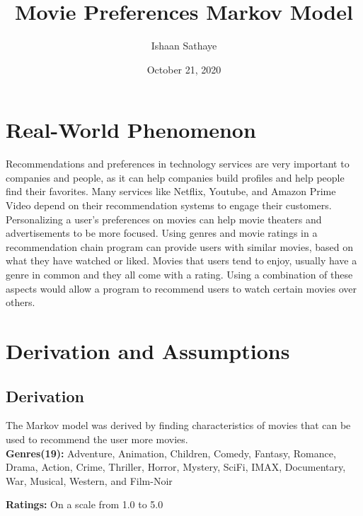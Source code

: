 \documentclass{article}
\title{Movie Preferences Markov Model}
\author{Ishaan Sathaye }
\date{October 21, 2020}
\begin{document}
\maketitle

\section{Real-World Phenomenon}
Recommendations and preferences in technology services are very important to 
companies and people, as it can help companies build profiles and help people find their favorites.
Many services like Netflix, Youtube, and Amazon Prime Video depend on their recommendation systems to engage their customers.
Personalizing a user's preferences on movies can help movie theaters and advertisements to be more focused. Using genres and movie ratings
in a recommendation chain program can provide users with similar movies, based on what they have watched or liked. Movies that users 
tend to enjoy, usually have a genre in common and they all come with a rating. Using a combination of these aspects would allow a program to 
recommend users to watch certain movies over others. 

\section{Derivation and Assumptions}
\subsection{Derivation}
The Markov model was derived by finding characteristics of movies that can be used to recommend the user more movies.\\

\textbf{Genres(19):} Adventure, Animation, Children, Comedy, Fantasy, Romance, Drama, Action, Crime, Thriller, Horror, Mystery, SciFi, IMAX, Documentary,
War, Musical, Western, and Film-Noir

\textbf{Ratings:} On a scale from 1.0 to 5.0\\
\end{document}
